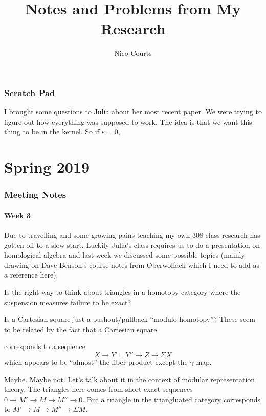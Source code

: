 \documentclass[12pt]{article}
\theoremstyle{nonumberbreak}
\theoremstyle{changebreak}
\theoremstyle{nonumberplain}
\theoremstyle{change}
\let\oldpart\part%
\renewcommand{\part}{\clearpage\oldpart}%
\begin{document}
\title{Notes and Problems from My Research\vspace{-1ex}}
\author{Nico Courts}
\date{}
\maketitle


\section{Scratch Pad}
I brought some questions to Julia about her most recent paper. We were trying to figure out how everything was supposed to work.
The idea is that we want this thing to be in the kernel. So if $\varepsilon=0$, 

\part{Spring 2019}
\section{Meeting Notes}

\subsection{Week 3}
Due to travelling and some growing pains teaching my own 308 class research has gotten off to a slow
start. Luckily Julia's class requires us to do a presentation on homological algebra and last week 
we discussed some possible topics (mainly drawing on Dave Benson's course notes from Oberwolfach which I need 
to add as a reference here).

\begin{qst} Is the right way to think about triangles in a homotopy category where the suspension
measures failure to be exact? 

Is a Cartesian square just a pushout/pullback ``modulo homotopy''? These seem to be related by 
the fact that a Cartesian square
\begin{center}
\end{center}
corresponds to a sequence
\[X\to Y'\sqcup Y''\to Z\to \Sigma X\]
which appears to be ``almost'' the fiber product except the $\gamma$ map.
\end{qst}

Maybe. Maybe not. Let's talk about it in the context of modular representation theory. The triangles 
here comes from short exact sequences $0\to M'\to M\to M''\to 0$. But a triangle in the 
triangluated category corresponds to $M'\to M\to M''\to \Sigma M$. 
\end{document}
